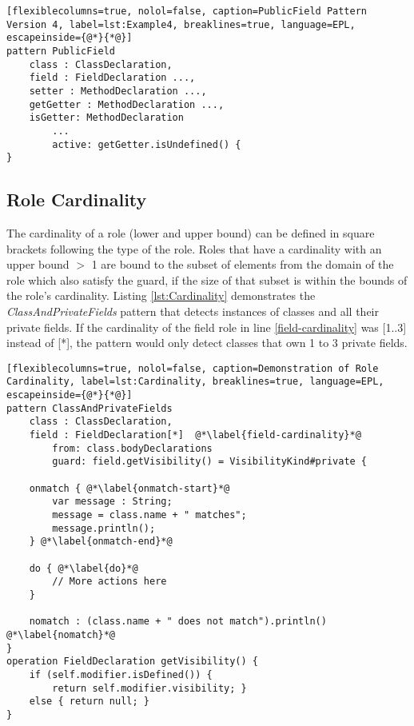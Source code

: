 \begin{lstlisting}[flexiblecolumns=true, nolol=false, caption=PublicField Pattern Version 4, label=lst:Example4, breaklines=true, language=EPL, escapeinside={@*}{*@}]
pattern PublicField
	class : ClassDeclaration,
	field : FieldDeclaration ...,
	setter : MethodDeclaration ...,
	getGetter : MethodDeclaration ...,
	isGetter: MethodDeclaration
		...
		active: getGetter.isUndefined() {
}
\end{lstlisting}

\subsection{Role Cardinality}
The cardinality of a role (lower and upper bound) can be defined in square brackets following the type of the role. Roles that have a cardinality with an upper bound $>$ 1 are bound to the subset of elements from the domain of the role which also satisfy the guard, if the size of that subset is within the bounds of the role's cardinality. Listing \ref{lst:Cardinality} demonstrates the \emph{ClassAndPrivateFields} pattern that detects instances of classes and all their private fields. If the cardinality of the field role in line \ref{field-cardinality} was [1..3] instead of [*], the pattern would only detect classes that own 1 to 3 private fields.

\clearpage
\begin{lstlisting}[flexiblecolumns=true, nolol=false, caption=Demonstration of Role Cardinality, label=lst:Cardinality, breaklines=true, language=EPL, escapeinside={@*}{*@}]
pattern ClassAndPrivateFields
	class : ClassDeclaration,
	field : FieldDeclaration[*]  @*\label{field-cardinality}*@
		from: class.bodyDeclarations
		guard: field.getVisibility() = VisibilityKind#private {
	
	onmatch { @*\label{onmatch-start}*@
	 	var message : String;
	 	message = class.name + " matches";
	 	message.println();
	} @*\label{onmatch-end}*@
	
	do { @*\label{do}*@
		// More actions here
	}
	
	nomatch : (class.name + " does not match").println() @*\label{nomatch}*@
}
operation FieldDeclaration getVisibility() {
	if (self.modifier.isDefined()) {
		return self.modifier.visibility; }
	else { return null; }
}
\end{lstlisting}

